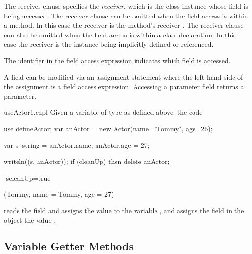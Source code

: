 The receiver-clause specifies the \emph{receiver}, which is the class
instance whose field is being accessed.
The receiver clause can be omitted when the field access is within a method.
In this case the receiver is the method's receiver .
The receiver clause can also be omitted when the field access is within
a class declaration. In this case the receiver is the instance
being implicitly defined or referenced.

The identifier in the field access expression indicates which field is accessed.


A field can
be modified via an assignment statement where the left-hand side of
the assignment is a field access expression.
Accessing a parameter field returns a parameter.

\begin{chapelexample}{useActor1.chpl}
Given a variable  of type  as defined above,
the code
\begin{chapelpre}
use defineActor;
var anActor = new Actor(name="Tommy", age=26);
\end{chapelpre}
\begin{chapel}
var s: string = anActor.name;
anActor.age = 27;
\end{chapel}
\begin{chapelpost}
writeln((s, anActor));
if (cleanUp) then delete anActor;
\end{chapelpost}
\begin{chapelcompopts}
-scleanUp=true
\end{chapelcompopts}
\begin{chapeloutput}
(Tommy, {name = Tommy, age = 27})
\end{chapeloutput}
reads the field  and assigns the value to the variable
, and assigns the field  in the object
 the value .
\end{chapelexample}

\subsection{Variable Getter Methods}
\label{Getter_Methods}

